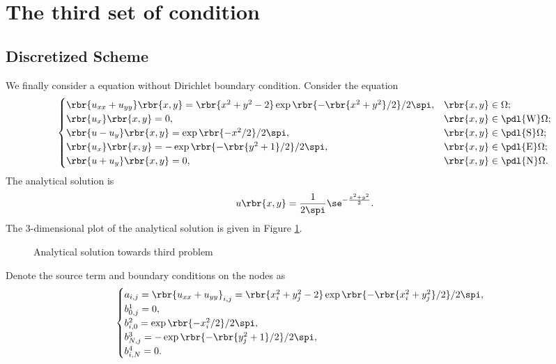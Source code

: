 \documentclass[english, nochinese]{pnote}
\begin{document}
\section{The third set of condition}

\subsection{Discretized Scheme}

We finally consider a equation without Dirichlet boundary condition. Consider the equation
\begin{equation}
\begin{cases}
\rbr{ u_{ x x } + u_{ y y } } \rbr{ x, y } = \rbr{ x^2 + y^2 - 2 } \exp \rbr{ -\rbr{ x^2 + y^2 } / 2 } / 2 \spi, & \rbr{ x, y } \in \Omega; \\
\rbr{u_x} \rbr{ x, y } = 0, & \rbr{ x, y } \in \pdl{\text{W}} \Omega; \\
\rbr{ u - u_y } \rbr{ x, y }  = \exp \rbr{ -x^2 / 2 } / 2 \spi, & \rbr{ x, y } \in \pdl{\text{S}} \Omega; \\
\rbr{u_x} \rbr{ x, y } = -\exp \rbr{ -\rbr{ y^2 + 1 } / 2 } / 2 \spi, & \rbr{ x, y } \in \pdl{\text{E}} \Omega; \\
\rbr{ u + u_y } \rbr{ x, y } = 0, & \rbr{ x, y } \in \pdl{\text{N}} \Omega.
\end{cases}
\end{equation}
The analytical solution is
\begin{equation}
u \rbr{ x, y } = \frac{1}{ 2 \spi } \se^{-\frac{ x^2 + y^2 }{2}}.
\end{equation}
The 3-dimensional plot of the analytical solution is given in Figure \ref{Fig:Prob33D}.
\begin{figure}[htbp]
\centering

\caption{Analytical solution towards third problem}
\label{Fig:Prob33D}
\end{figure}
Denote the source term and boundary conditions on the nodes as
\begin{equation}
\begin{cases}
a_{ i, j } = \rbr{ u_{ x x } + u_{ y y } }_{ i, j } = \rbr{ x_i^2 + y_j^2 - 2 } \exp \rbr{ -\rbr{ x_i^2 + y_j^2 } / 2 } / 2 \spi, \\
b^1_{ 0, j } = 0, \\
b^2_{ i, 0 } = \exp \rbr{ -x_i^2 / 2 } / 2 \spi, \\
b^3_{ N, j } = -\exp \rbr{ -\rbr{ y_j^2 + 1 } / 2 } / 2 \spi, \\
b^4_{ i, N } = 0.
\end{cases}
\end{equation}
\end{document}
